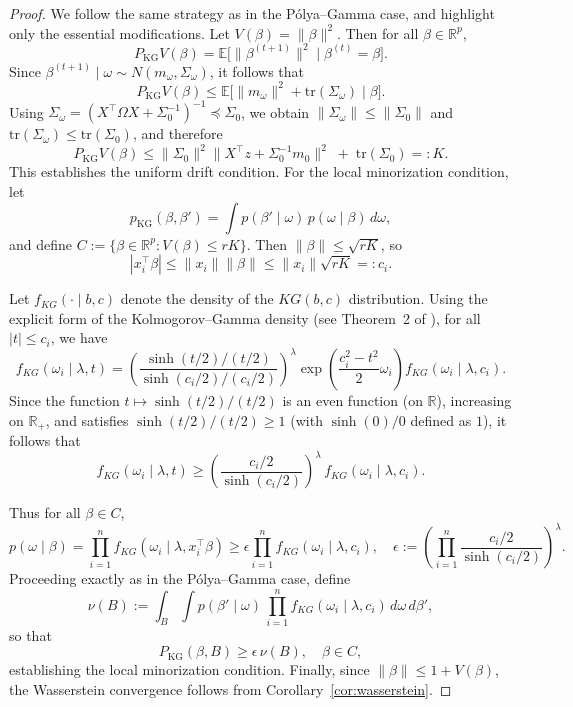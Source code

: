 \documentclass[ejsv2, noshowframe]{imsart}
\theoremstyle{plain}
\theoremstyle{definition}
\theoremstyle{remark}
\newcommand{\tr}{\text{tr}}
\newcommand{\R}{\mathbb{R}}
\newcommand{\E}{\mathbb{E}}
\begin{document}
\begin{proof}
We follow the same strategy as in the P\'olya--Gamma case, and highlight only the essential modifications. Let $V(\beta) = \|\beta\|^2$. Then for all $\beta \in \R^p$,
\[
P_{\mathrm{KG}} V(\beta)
= \E\big[ \|\beta^{(t+1)}\|^2 \mid \beta^{(t)} = \beta \big]. 
\]
Since $\beta^{(t+1)} \mid \omega \sim N(m_\omega, \Sigma_\omega)$, it follows that 
\[
P_{\mathrm{KG}} V(\beta)
\le \E\big[ \|m_\omega\|^2 + \tr(\Sigma_\omega) \mid \beta \big].
\]
Using $\Sigma_\omega = (X^\top \Omega X + \Sigma_0^{-1})^{-1} \preceq \Sigma_0$, we obtain $\|\Sigma_\omega\| \le \|\Sigma_0\|$ and $\tr(\Sigma_\omega) \le \tr(\Sigma_0)$, and therefore
\[
P_{\mathrm{KG}} V(\beta)
\le \|\Sigma_0\|^2 \|X^\top z + \Sigma_0^{-1} m_0\|^2
\;+\; \tr(\Sigma_0)
=: K.
\]
This establishes the uniform drift condition. For the local minorization condition, let
\[
p_{\mathrm{KG}}(\beta,\beta')
= \int p(\beta' \mid \omega)\, p(\omega \mid \beta)\, d\omega,
\]
and define $C := \{\beta \in \R^p : V(\beta) \le rK\}$. Then $\|\beta\|\le \sqrt{rK}$, so
\[
|x_i^\top \beta|
\le \|x_i\| \|\beta\|
\le \|x_i\| \sqrt{rK}
=: c_i.
\]

\noindent
Let $f_{KG}(\cdot \mid b, c)$ denote the density of the $KG(b,c)$ distribution. Using the explicit form of the Kolmogorov--Gamma density (see Theorem~2 of \cite{LeeEtAlKG}), for all $|t|\le c_i$, we have 
\[
f_{KG}(\omega_i \mid \lambda, t)
=
\left( \frac{\sinh(t/2)/(t/2)}{\sinh(c_i/2)/(c_i/2)} \right)^\lambda
\exp\!\left(\frac{c_i^2 - t^2}{2}\omega_i\right)
f_{KG}(\omega_i \mid \lambda, c_i).
\]
Since the function $t \mapsto \sinh(t/2)/(t/2)$ is an even function (on $\mathbb{R}$), increasing on $\mathbb{R}_+$, and satisfies $\sinh(t/2)/(t/2) \ge 1$ (with $\sinh(0)/0$ defined as $1$), it follows that
\[
f_{KG}(\omega_i \mid \lambda, t)
\ge \left( \frac{c_i/2}{\sinh(c_i/2)} \right)^\lambda
\, f_{KG}(\omega_i \mid \lambda, c_i).
\]

Thus for all $\beta \in C$,
\[
p(\omega \mid \beta)
= \prod_{i=1}^n f_{KG}(\omega_i \mid \lambda, x_i^\top \beta)
\ge \epsilon \prod_{i=1}^n f_{KG}(\omega_i \mid \lambda, c_i),
\quad
\epsilon := \left( \prod_{i=1}^n \frac{c_i/2}{\sinh(c_i/2)} \right)^\lambda. 
\]
Proceeding exactly as in the P\'olya--Gamma case, define
\[
\nu(B) := \int_B \int p(\beta' \mid \omega)
\, \prod_{i=1}^n f_{KG}(\omega_i \mid \lambda, c_i)\, d\omega\, d\beta',
\]
so that
\[
P_{\mathrm{KG}}(\beta, B)
\ge \epsilon \, \nu(B),
\quad \beta \in C,
\]
establishing the local minorization condition. Finally, since $\|\beta\| \le 1 + V(\beta)$, the Wasserstein convergence follows from Corollary~\ref{cor:wasserstein}. 
\end{proof}
\end{document}
